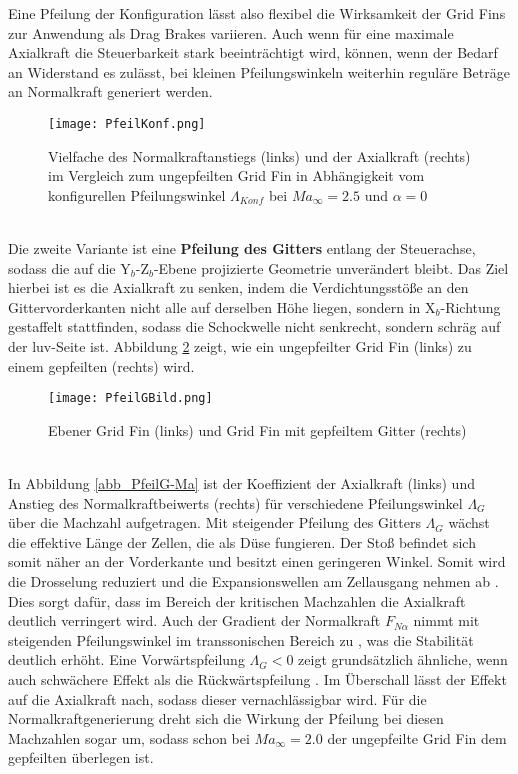 Eine Pfeilung der Konfiguration lässt also flexibel die Wirksamkeit der Grid Fins zur Anwendung als Drag Brakes variieren. Auch wenn für eine maximale Axialkraft die Steuerbarkeit stark beeinträchtigt wird, können, wenn der Bedarf an Widerstand es zulässt, bei kleinen Pfeilungswinkeln weiterhin reguläre Beträge an Normalkraft generiert werden.
\begin{figure}[h]
	\centering
	\texttt{[image: PfeilKonf.png]}
	\begin{flushright}
	\end{flushright}
	\caption{Vielfache des Normalkraftanstiegs (links) und der Axialkraft (rechts) im Vergleich zum ungepfeilten Grid Fin in Abhängigkeit vom konfigurellen Pfeilungswinkel $\Lambda_{Konf}$ bei $Ma_\infty = 2.5$ und $\alpha = 0$}
	\label{abb_lastvielfache}
\end{figure}\\
Die zweite Variante ist eine \textbf{Pfeilung des Gitters} entlang der Steuerachse, sodass die auf die Y$_b$-Z$_b$-Ebene projizierte Geometrie unverändert bleibt. Das Ziel hierbei ist es die Axialkraft zu senken, indem die Verdichtungsstöße an den Gittervorderkanten nicht alle auf derselben Höhe liegen, sondern in X$_b$-Richtung gestaffelt stattfinden, sodass die Schockwelle nicht senkrecht, sondern schräg auf der luv-Seite ist. Abbildung \ref{abb_PfeilG} zeigt, wie ein ungepfeilter Grid Fin (links) zu einem gepfeilten (rechts) wird.
\begin{figure}[h]
	\centering
	\texttt{[image: PfeilGBild.png]}
	\begin{flushright}
			\flushbottom{Quelle: \cite{sb-sharp}}
	\end{flushright}
	\caption{Ebener Grid Fin (links) und Grid Fin mit gepfeiltem Gitter (rechts)}
	\label{abb_PfeilG}
\end{figure}\\
In Abbildung \ref{abb_PfeilG-Ma} ist der Koeffizient der Axialkraft (links) und Anstieg des Normalkraftbeiwerts (rechts) für verschiedene Pfeilungswinkel $\Lambda_{G}$ über die Machzahl aufgetragen. Mit steigender Pfeilung des Gitters $\Lambda_G$ wächst die effektive Länge der Zellen, die als Düse fungieren. Der Stoß befindet sich somit näher an der Vorderkante und besitzt einen geringeren Winkel. Somit wird die Drosselung reduziert und die Expansionswellen am Zellausgang nehmen ab \cite{PfeilG1}. Dies sorgt dafür, dass im Bereich der kritischen Machzahlen die Axialkraft deutlich verringert wird. Auch der Gradient der Normalkraft $F_{N\alpha}$ nimmt mit steigenden Pfeilungswinkel im transsonischen Bereich zu \cite{PfeilG1}, was die Stabilität deutlich erhöht. Eine Vorwärtspfeilung $\Lambda_{G} < 0$ zeigt grundsätzlich ähnliche, wenn auch schwächere Effekt als die Rückwärtspfeilung \cite{PfeilG2}. Im Überschall lässt der Effekt auf die Axialkraft nach, sodass dieser vernachlässigbar wird. Für die Normalkraftgenerierung dreht sich die Wirkung der Pfeilung bei diesen Machzahlen sogar um, sodass schon bei $Ma_\infty=2.0$ der ungepfeilte Grid Fin dem gepfeilten überlegen ist.

